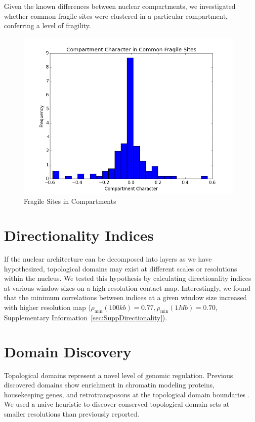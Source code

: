 Given the known differences between nuclear compartments, we investigated whether common fragile sites were clustered in a particular
compartment, conferring a level of fragility.

\begin{figure}[thp]
  \centering
  \caption{Fragile Sites in Compartments}\label{fig:compartmentCfs}
  \includegraphics[width=\textwidth]{./figures/results/cfs.png}
\end{figure}

\section*{Directionality Indices}

If the nuclear architecture can be decomposed into layers as we have hypothesized, topological domains may exist at different
scales or resolutions within the nucleus.  We tested this hypothesis by calculating directionality indices at various window sizes
on a high resolution contact map.  Interestingly, we found that the minimum correlations between indices at a given window size increased
with higher resolution map ($\rho_{\min}(100kb) = 0.77, \rho_{\min}(1Mb) = 0.70$, Supplementary Information~\ref{sec:SuppDirectionality}).

\section*{Domain Discovery}

Topological domains represent a novel level of genomic regulation.  Previous discovered domains show enrichment in chromatin modeling proteins,
housekeeping genes, and retrotransposons at the topological domain boundaries \citep{dixon2012}.  We used a naive heuristic to discover conserved
topological domain sets at smaller resolutions than previously reported.


